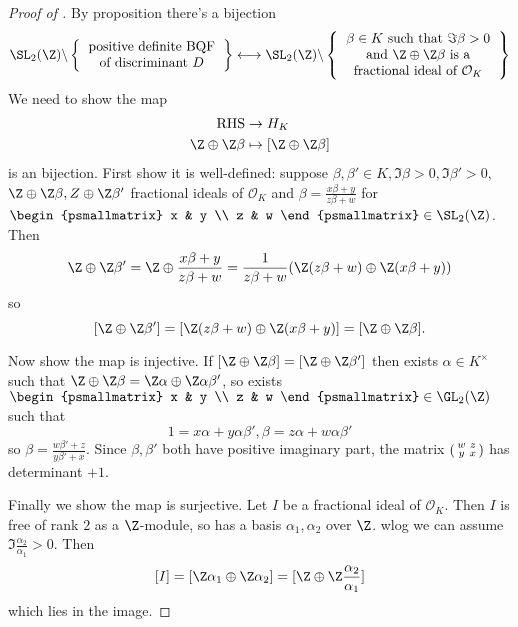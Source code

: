 \documentclass[a4paper]{article}
\renewcommand*{\O}{\mathcal{O}}
\begin{document}
\begin{proof}[Proof of ]
  By proposition there's a bijection
  \[
    \SL_2(\Z) \backslash
    \left\{
    \begin{tabular}{c}
      positive definite BQF \\
      of discriminant \(D\)
    \end{tabular}
    \right\}
    \longleftrightarrow
    \SL_2(\Z) \backslash
    \left\{
      \begin{tabular}{c}
        \(\beta \in K\) such that \(\Im \beta > 0\) \\
        and \(\Z \oplus \Z \beta\) is a \\
        fractional ideal of \(\O_K\)
      \end{tabular}
    \right\}
  \]
  We need to show the map
  \begin{align*}
    \mathrm{RHS} &\to H_K \\
    \Z \oplus \Z \beta &\mapsto [\Z \oplus \Z \beta]
  \end{align*}
  is an bijection. First show it is well-defined: suppose \(\beta, \beta' \in K, \Im \beta > 0, \Im \beta' > 0\), \(\Z \oplus \Z \beta, Z \oplus \Z \beta'\) fractional ideals of \(\O_K\) and \(\beta = \frac{x \beta + y}{z \beta + w}\) for \(
  \begin{psmallmatrix}
    x & y \\
    z & w
  \end{psmallmatrix}
  \in \SL_2(\Z)\). Then
  \[
    \Z \oplus \Z \beta' = \Z \oplus \frac{x\beta + y}{z\beta + w} = \frac{1}{z\beta + w} (\Z(z \beta + w) \oplus \Z(x\beta + y))
  \]
  so
  \[
    [\Z \oplus \Z \beta'] = [\Z(z \beta + w) \oplus \Z(x \beta + y)] = [\Z \oplus \Z \beta].
  \]

  Now show the map is injective. If \([\Z \oplus \Z\beta] = [\Z \oplus \Z \beta']\) then exists \(\alpha \in K^\times\) such that \(\Z \oplus \Z \beta = \Z \alpha \oplus \Z \alpha \beta'\), so exists \(
  \begin{psmallmatrix}
    x & y \\
    z & w
  \end{psmallmatrix}
  \in \GL_2(\Z)\) such that
  \[
    1 = x\alpha + y \alpha \beta', \beta = z \alpha + w \alpha \beta'
  \]
  so \(\beta = \frac{w\beta' + z}{y\beta' + x}\). Since \(\beta, \beta'\) both have positive imaginary part, the matrix \(
  \begin{psmallmatrix}
    w & z \\
    y & x
  \end{psmallmatrix}
  \) has determinant \(+ 1\).

  Finally we show the map is surjective. Let \(I\) be a fractional ideal of \(\O_K\). Then \(I\) is free of rank \(2\) as a \(\Z\)-module, so has a basis \(\alpha_1, \alpha_2\) over \(\Z\). wlog we can assume \(\Im \frac{\alpha_2}{\alpha_1} > 0\). Then
  \[
    [I] = [\Z \alpha_1 \oplus \Z \alpha_2] = [\Z \oplus \Z \frac{\alpha_2}{\alpha_1}]
  \]
  which lies in the image.
\end{proof}
\end{document}
